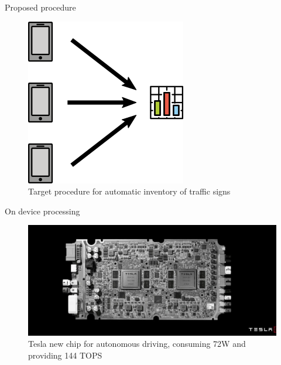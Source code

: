\documentclass{beamer}
\begin{document}
\begin{frame}{Proposed procedure}
    \begin{figure}
        \centering
        \includegraphics[width=0.4\linewidth]{figures/self_made/proposed.png}
        \caption{Target procedure for automatic inventory of traffic signs}
    \end{figure}{}
\end{frame}{}

\begin{frame}{On device processing}
    \begin{figure}
        \centering
        \includegraphics[width=0.7\linewidth]{figures/tesla-ship.jpg}
        \caption{Tesla new chip for autonomous driving, consuming 72W and providing 144 TOPS}
    \end{figure}{}
\end{frame}{}
\end{document}

